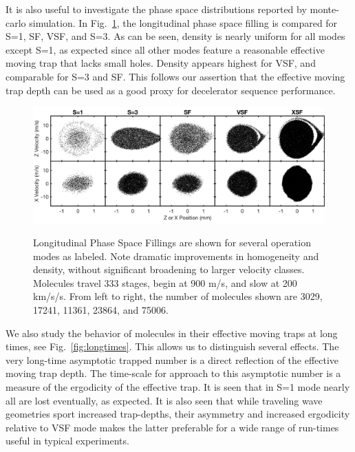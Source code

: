 \documentclass[%
 reprint,
 amsmath,amssymb,
 aps,
prl,
]{revtex4-1}
\begin{document}
It is also useful to investigate the phase space distributions reported by monte-carlo simulation.
In Fig.~\ref{fig:phasespace}, the longitudinal phase space filling is compared for S=1, SF, VSF, and S=3. 
As can be seen, density is nearly uniform for all modes except S=1, as expected since all other modes feature a reasonable effective moving trap that lacks small holes. 
Density appears highest for VSF, and comparable for S=3 and SF. 
This follows our assertion that the effective moving trap depth can be used as a good proxy for decelerator sequence performance.

\begin{figure}[t]
\includegraphics[width=\linewidth]{5x2-PSD-Compare.png}
\label{fig:phasespace}
\vspace{-22pt}
\caption{
Longitudinal Phase Space Fillings are shown for several operation modes as labeled. Note dramatic improvements in homogeneity and density, without significant broadening to larger velocity classes. Molecules travel 333 stages, begin at 900 m/s, and slow at 200 km/s/s. From left to right, the number of molecules shown are 3029, 17241, 11361, 23864, and 75006.
}
\end{figure}

We also study the behavior of molecules in their effective moving traps at long times, see Fig.~\ref{fig:longtimes}.
This allows us to distinguish several effects. 
The very long-time asymptotic trapped number is a direct reflection of the effective moving trap depth.
The time-scale for approach to this asymptotic number is a measure of the ergodicity of the effective trap.
It is seen that in S=1 mode nearly all are lost eventually, as expected.
It is also seen that while traveling wave geometries sport increased trap-depths, their asymmetry and increased ergodicity relative to VSF mode makes the latter preferable for a wide range of run-times useful in typical experiments.
\end{document}

